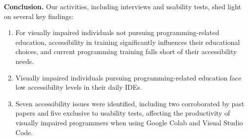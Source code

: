 {\bf Conclusion.} Our activities, including interviews and usability tests, shed light on several key findings:

\begin{enumerate}

\item For visually impaired individuals not pursuing programming-related education, accessibility in training significantly influences their educational choices, and current programming training falls short of their accessibility needs.

\item Visually impaired individuals pursuing programming-related education face low accessibility levels in their daily IDEs.

\item Seven accessibility issues were identified, including two corroborated by past papers and five exclusive to usability tests, affecting the productivity of visually impaired programmers when using Google Colab and Visual Studio Code.

\end{enumerate}




